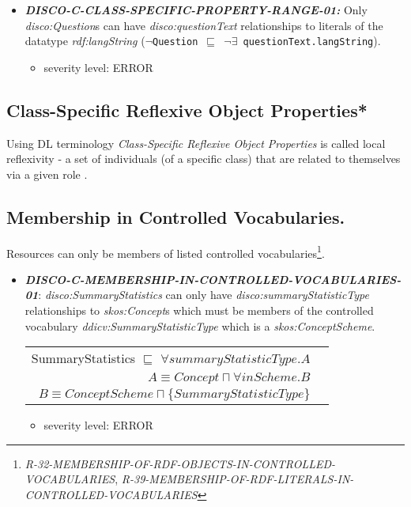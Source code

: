 \documentclass{llncs}
\newcommand{\ms}[1]{\texttt{#1}}
\newenvironment{DL}{
  \vspace{0cm}
  \begin{tabular}{r l}

}{
  \end{tabular}
}
\begin{document}
\begin{itemize}
	\item \textbf{{\em DISCO-C-CLASS-SPECIFIC-PROPERTY-RANGE-01:}}
Only {\em disco:Question}s can have {\em disco:questionText} relationships to literals of the datatype {\em rdf:langString} (\ms{$\neg$Question $\sqsubseteq$ $\neg\exists$ questionText.langString}).
	\begin{itemize}
		\item severity level: ERROR
	\end{itemize}
\end{itemize}

\subsection{Class-Specific Reflexive Object Properties*}

Using DL terminology \emph{Class-Specific Reflexive Object Properties} is called local reflexivity - a set of individuals (of a specific class) that are related to themselves via a given role \cite{Kroetzsch2012}.

\subsection{Membership in Controlled Vocabularies.}

Resources can only be members of listed controlled vocabularies\footnote{{\em R-32-MEMBERSHIP-OF-RDF-OBJECTS-IN-CONTROLLED-VOCABULARIES}, 
{\em R-39-MEMBERSHIP-OF-RDF-LITERALS-IN-CONTROLLED-VOCABULARIES}}.

\begin{itemize}
	\item \textbf{{\em DISCO-C-MEMBERSHIP-IN-CONTROLLED-VOCABULARIES-01}}:
{\em disco:SummaryStatistics} can only have {\em disco:summaryStatisticType} relationships to {\em skos:Concept}s which must be members of the controlled vocabulary {\em ddicv:SummaryStatisticType} which is a {\em skos:ConceptScheme}.

\begin{DL}
SummaryStatistics $\sqsubseteq$ $\forall summaryStatisticType.A$ \\
$A \equiv Concept \sqcap \forall inScheme . B$ \\
$B \equiv ConceptScheme \sqcap \{SummaryStatisticType\}$
\end{DL}

\begin{itemize}
		\item severity level: ERROR
	\end{itemize}
\end{itemize}
\end{document}
